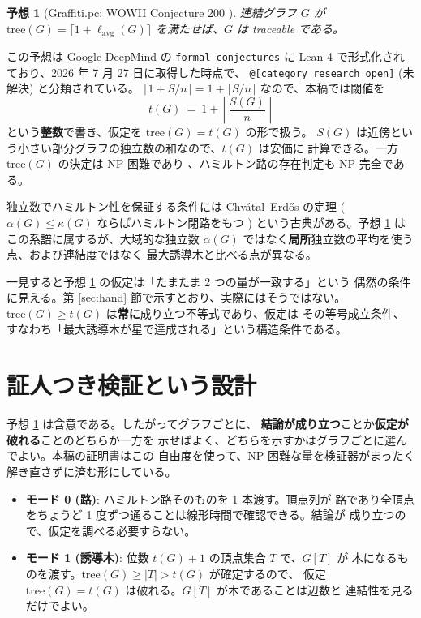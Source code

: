 \documentclass[paper=a4,fontsize=10.5pt,jafontsize=10.5pt]{jlreq}
\theoremstyle{plain}
\newtheorem{conjecture}[theorem]{予想}
\theoremstyle{definition}
\begin{document}
\begin{conjecture}[Graffiti.pc; WOWII Conjecture 200 \cite{wowii}]\label{conj:200}
連結グラフ $G$ が
$\mathrm{tree}(G) = \lceil 1 + \ell_{\mathrm{avg}}(G) \rceil$
を満たせば、$G$ は traceable である。
\end{conjecture}

この予想は Google DeepMind の \texttt{formal-conjectures} \cite{formalconj} に
Lean 4 で形式化されており、2026 年 7 月 27 日に取得した時点で、
\texttt{@[category research open]} (未解決) と分類されている。
$\lceil 1 + S/n \rceil = 1 + \lceil S/n \rceil$ なので、本稿では閾値を
\begin{equation}\label{eq:t}
t(G) \ = \ 1 + \left\lceil \frac{S(G)}{n} \right\rceil
\end{equation}
という\textbf{整数}で書き、仮定を $\mathrm{tree}(G) = t(G)$ の形で扱う。
$S(G)$ は近傍という小さい部分グラフの独立数の和なので、$t(G)$ は安価に
計算できる。一方 $\mathrm{tree}(G)$ の決定は NP 困難であり
\cite{erdossakssos}、ハミルトン路の存在判定も NP 完全である。

独立数でハミルトン性を保証する条件には Chvátal--Erdős の定理
($\alpha(G) \le \kappa(G)$ ならばハミルトン閉路をもつ \cite{chvatalerdos})
という古典がある。予想 \ref{conj:200} はこの系譜に属するが、大域的な独立数
$\alpha(G)$ ではなく\textbf{局所}独立数の平均を使う点、および連結度ではなく
最大誘導木と比べる点が異なる。

一見すると予想 \ref{conj:200} の仮定は「たまたま 2 つの量が一致する」という
偶然の条件に見える。第 \ref{sec:hand} 節で示すとおり、実際にはそうではない。
$\mathrm{tree}(G) \ge t(G)$ は\textbf{常に}成り立つ不等式であり、仮定は
その等号成立条件、すなわち「最大誘導木が星で達成される」という構造条件である。

\section{証人つき検証という設計}\label{sec:design}

予想 \ref{conj:200} は含意である。したがってグラフごとに、
\textbf{結論が成り立つ}ことか\textbf{仮定が破れる}ことのどちらか一方を
示せばよく、どちらを示すかはグラフごとに選んでよい。本稿の証明書はこの
自由度を使って、NP 困難な量を検証器がまったく解き直さずに済む形にしている。

\begin{itemize}
\item \textbf{モード 0 (路)}: ハミルトン路そのものを 1 本渡す。頂点列が
  路であり全頂点をちょうど 1 度ずつ通ることは線形時間で確認できる。結論が
  成り立つので、仮定を調べる必要すらない。
\item \textbf{モード 1 (誘導木)}: 位数 $t(G)+1$ の頂点集合 $T$ で、$G[T]$ が
  木になるものを渡す。$\mathrm{tree}(G) \ge |T| > t(G)$ が確定するので、
  仮定 $\mathrm{tree}(G) = t(G)$ は破れる。$G[T]$ が木であることは辺数と
  連結性を見るだけでよい。
\end{itemize}
\end{document}
